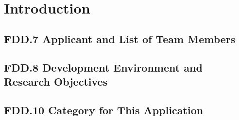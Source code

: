 

\chapter{Introduction}
\section{FDD.7 Applicant and List of Team Members}

\section{FDD.8 Development Environment and Research Objectives}

\section{FDD.10 Category for This Application}
